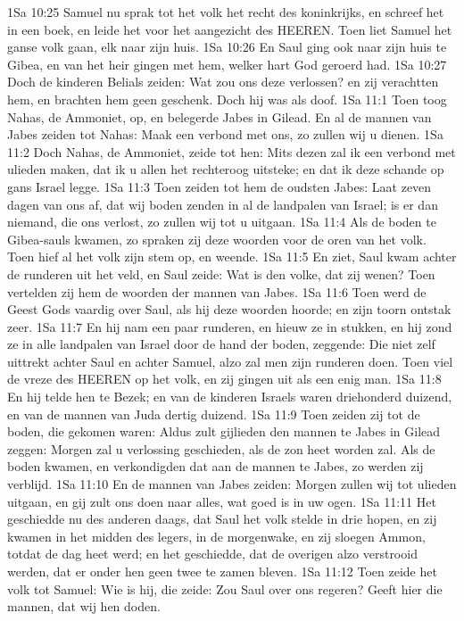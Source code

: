 1Sa 10:25  Samuel nu sprak tot het volk het recht des koninkrijks, en schreef het in een boek, en leide het voor het aangezicht des HEEREN. Toen liet Samuel het ganse volk gaan, elk naar zijn huis.
1Sa 10:26  En Saul ging ook naar zijn huis te Gibea, en van het heir gingen met hem, welker hart God geroerd had.
1Sa 10:27  Doch de kinderen Belials zeiden: Wat zou ons deze verlossen? en zij verachtten hem, en brachten hem geen geschenk. Doch hij was als doof.
1Sa 11:1  Toen toog Nahas, de Ammoniet, op, en belegerde Jabes in Gilead. En al de mannen van Jabes zeiden tot Nahas: Maak een verbond met ons, zo zullen wij u dienen.
1Sa 11:2  Doch Nahas, de Ammoniet, zeide tot hen: Mits dezen zal ik een verbond met ulieden maken, dat ik u allen het rechteroog uitsteke; en dat ik deze schande op gans Israel legge.
1Sa 11:3  Toen zeiden tot hem de oudsten Jabes: Laat zeven dagen van ons af, dat wij boden zenden in al de landpalen van Israel; is er dan niemand, die ons verlost, zo zullen wij tot u uitgaan.
1Sa 11:4  Als de boden te Gibea-sauls kwamen, zo spraken zij deze woorden voor de oren van het volk. Toen hief al het volk zijn stem op, en weende.
1Sa 11:5  En ziet, Saul kwam achter de runderen uit het veld, en Saul zeide: Wat is den volke, dat zij wenen? Toen vertelden zij hem de woorden der mannen van Jabes.
1Sa 11:6  Toen werd de Geest Gods vaardig over Saul, als hij deze woorden hoorde; en zijn toorn ontstak zeer.
1Sa 11:7  En hij nam een paar runderen, en hieuw ze in stukken, en hij zond ze in alle landpalen van Israel door de hand der boden, zeggende: Die niet zelf uittrekt achter Saul en achter Samuel, alzo zal men zijn runderen doen. Toen viel de vreze des HEEREN op het volk, en zij gingen uit als een enig man.
1Sa 11:8  En hij telde hen te Bezek; en van de kinderen Israels waren driehonderd duizend, en van de mannen van Juda dertig duizend.
1Sa 11:9  Toen zeiden zij tot de boden, die gekomen waren: Aldus zult gijlieden den mannen te Jabes in Gilead zeggen: Morgen zal u verlossing geschieden, als de zon heet worden zal. Als de boden kwamen, en verkondigden dat aan de mannen te Jabes, zo werden zij verblijd.
1Sa 11:10  En de mannen van Jabes zeiden: Morgen zullen wij tot ulieden uitgaan, en gij zult ons doen naar alles, wat goed is in uw ogen.
1Sa 11:11  Het geschiedde nu des anderen daags, dat Saul het volk stelde in drie hopen, en zij kwamen in het midden des legers, in de morgenwake, en zij sloegen Ammon, totdat de dag heet werd; en het geschiedde, dat de overigen alzo verstrooid werden, dat er onder hen geen twee te zamen bleven.
1Sa 11:12  Toen zeide het volk tot Samuel: Wie is hij, die zeide: Zou Saul over ons regeren? Geeft hier die mannen, dat wij hen doden.
